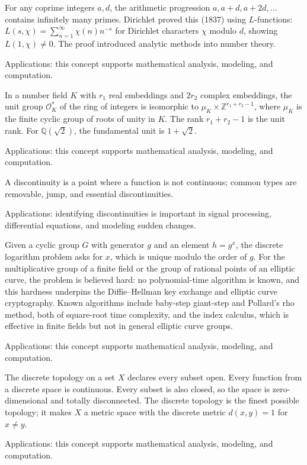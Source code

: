 For any coprime integers $a, d$, the arithmetic progression $a, a+d, a+2d, \ldots$ contains infinitely many primes. Dirichlet proved this (1837) using $L$-functions: $L(s, \chi) = \sum_{n=1}^{\infty} \chi(n)n^{-s}$ for Dirichlet characters $\chi$ modulo $d$, showing $L(1, \chi) \neq 0$. The proof introduced analytic methods into number theory. \par\noindent Applications: this concept supports mathematical analysis, modeling, and computation.

In a number field $K$ with $r_1$ real embeddings and $2r_2$ complex embeddings, the unit group $\mathcal{O}_K^*$ of the ring of integers is isomorphic to $\mu_K \times \mathbb{Z}^{r_1 + r_2 - 1}$, where $\mu_K$ is the finite cyclic group of roots of unity in $K$. The rank $r_1 + r_2 - 1$ is the unit rank. For $\mathbb{Q}(\sqrt{2})$, the fundamental unit is $1 + \sqrt{2}$. \par\noindent Applications: this concept supports mathematical analysis, modeling, and computation.

A discontinuity is a point where a function is not continuous; common types are removable, jump, and essential discontinuities. \par\noindent Applications: identifying discontinuities is important in signal processing, differential equations, and modeling sudden changes.

Given a cyclic group $G$ with generator $g$ and an element $h = g^x$, the discrete logarithm problem asks for $x$, which is unique modulo the order of $g$. For the multiplicative group of a finite field or the group of rational points of an elliptic curve, the problem is believed hard: no polynomial-time algorithm is known, and this hardness underpins the Diffie--Hellman key exchange and elliptic curve cryptography. Known algorithms include baby-step giant-step and Pollard's rho method, both of square-root time complexity, and the index calculus, which is effective in finite fields but not in general elliptic curve groups. \par\noindent Applications: this concept supports mathematical analysis, modeling, and computation.

The discrete topology on a set $X$ declares every subset open. Every function from a discrete space is continuous. Every subset is also closed, so the space is zero-dimensional and totally disconnected. The discrete topology is the finest possible topology; it makes $X$ a metric space with the discrete metric $d(x,y) = 1$ for $x \neq y$. \par\noindent Applications: this concept supports mathematical analysis, modeling, and computation.

